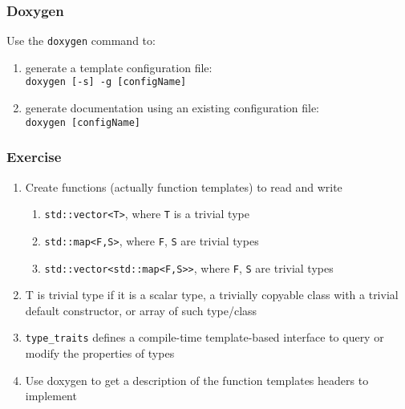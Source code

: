 \documentclass{beamer}
\begin{document}
\begin{frame}[fragile]
\frametitle{Doxygen}
Use the \texttt{doxygen} command to:
\begin{enumerate}
\item generate a template configuration file:\\
    \verb|doxygen [-s] -g [configName]|

\item generate documentation using an existing configuration file:\\
    \verb|doxygen [configName]|
\end{enumerate}
\end{frame}

\begin{frame}[fragile]
\frametitle{Exercise}
\begin{enumerate}
\item Create functions (actually function templates) to read and write 
\begin{enumerate}
\item \lstinline{std::vector<T>}, where \lstinline{T} is a trivial type
\item \lstinline{std::map<F,S>}, where \lstinline{F}, \lstinline{S} are trivial types
\item \lstinline{std::vector<std::map<F,S>>}, where \lstinline{F}, \lstinline{S} are trivial types
\end{enumerate}
\item T is \alert{trivial type} if it is a scalar type, 
a trivially copyable class with a trivial default constructor, 
or array of such type/class
\item \lstinline{type_traits} defines a compile-time template-based interface to query or modify the properties of types
\item Use doxygen to get a description of the function templates headers to implement
\end{enumerate}
\end{frame}
\end{document}
